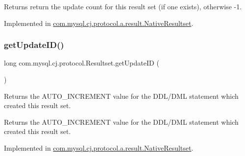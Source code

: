 \begin{DoxyReturn}{Returns}
return the update count for this result set (if one exists), otherwise -\/1. 
\end{DoxyReturn}


Implemented in \mbox{\hyperlink{classcom_1_1mysql_1_1cj_1_1protocol_1_1a_1_1result_1_1_native_resultset_a10bf057eb5f4fbf7602b519cd3e420b0}{com.\+mysql.\+cj.\+protocol.\+a.\+result.\+Native\+Resultset}}.

\mbox{\label{interfacecom_1_1mysql_1_1cj_1_1protocol_1_1_resultset_ab9b9750b3d8a9d8cc35af6d1e59dd86f}} 
\subsubsection{\texorpdfstring{get\+Update\+I\+D()}{getUpdateID()}}
{\footnotesize\ttfamily long com.\+mysql.\+cj.\+protocol.\+Resultset.\+get\+Update\+ID (\begin{DoxyParamCaption}{ }\end{DoxyParamCaption})}

Returns the A\+U\+T\+O\+\_\+\+I\+N\+C\+R\+E\+M\+E\+NT value for the D\+D\+L/\+D\+ML statement which created this result set.

\begin{DoxyReturn}{Returns}
the A\+U\+T\+O\+\_\+\+I\+N\+C\+R\+E\+M\+E\+NT value for the D\+D\+L/\+D\+ML statement which created this result set. 
\end{DoxyReturn}


Implemented in \mbox{\hyperlink{classcom_1_1mysql_1_1cj_1_1protocol_1_1a_1_1result_1_1_native_resultset_ac6a7ec2cf40f503d0978cb3a03a26b66}{com.\+mysql.\+cj.\+protocol.\+a.\+result.\+Native\+Resultset}}.

\mbox{\label{interfacecom_1_1mysql_1_1cj_1_1protocol_1_1_resultset_acafe4b216e2086884d0758c64fd34c0b}} 
